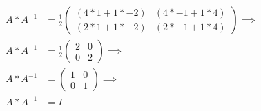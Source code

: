 \documentclass[a4paper,12pt]{article}
\begin{document}
\begin{itemize}
\begin{equation*}
\begin{split}
                  A*A^{-1}&=
                  \frac{1}{2}
                  \begin{pmatrix}
                      (4*1+1*-2) & (4*-1+1*4) \\
                      (2*1+1*-2) & (2*-1+1*4)
                  \end{pmatrix} \implies \\
                  A*A^{-1}&=
                  \frac{1}{2}
                  \begin{pmatrix}
                      2 & 0 \\
                      0 & 2
                  \end{pmatrix} \implies \\
                  A*A^{-1}&=
                  \begin{pmatrix}
                      1 & 0 \\
                      0 & 1
                  \end{pmatrix} \implies \\
                  A*A^{-1}&=I
              \end{split}
          \end{equation*}
          \vfill
\end{itemize}
\end{document}
